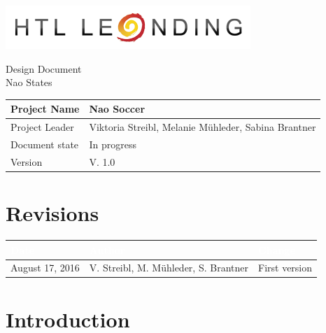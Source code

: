 \documentclass[12pt]{article}
\theoremstyle{definition}
\newcommand{\projectname}{Nao Soccer}
\newcommand{\productname}{Nao States}
\newcommand{\projectleader}{Viktoria Streibl, Melanie Mühleder, Sabina Brantner}
\newcommand{\documentstatus}{In progress}
\newcommand{\version}{V. 1.0}
\begin{document}
\begin{titlepage}
\begin{flushright}
\includegraphics[scale=.5]{htlleondinglogo.png}\\
\end{flushright}

\vspace{10em}

\begin{center}
{\Huge Design Document} \\[3em]
{\LARGE \productname} \\[3em]
\end{center}

\begin{flushleft}
\begin{tabular}{|l|l|}
\hline
Project Name & \projectname \\ \hline
Project Leader & \projectleader \\ \hline
Document state & \documentstatus \\ \hline
Version & \version \\ \hline
\end{tabular}
\end{flushleft}

\end{titlepage}
\section*{Revisions}
\begin{tabular}{|p{.25\linewidth}|p{.3\linewidth}|p{.37\linewidth}|}
\hline
\cellcolor[gray]{0.5}\textcolor{white}{Date} & \cellcolor[gray]{0.45}\textcolor{white}{Author} & \cellcolor[gray]{0.5}\textcolor{white}{Change} \\ \hline
August 17, 2016&V. Streibl, M. Mühleder, S. Brantner&First version \\ \hline
\end{tabular}
\pagebreak

\setcounter{tocdepth}{2}
\tableofcontents
\pagebreak

\section{Introduction}\label{sec:managementsummary}
\end{document}

